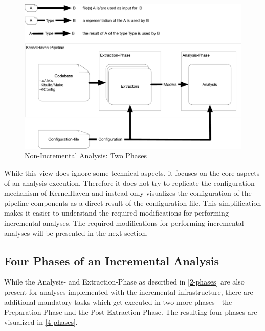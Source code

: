 \documentclass[a4paper]{article}
\begin{document}
\begin{figure}[h] 
  \centering
  \begin{minipage}[b]{1\textwidth} 
    \caption[Non-Incremental Analysis: Two Phases]{Non-Incremental Analysis: Two Phases}\label{2-phases-image}
    \includegraphics[width=1\textwidth]{img/KernelHaven.pdf}
  \end{minipage}
\end{figure}


While this view does ignore some technical aspects, it focuses on the core aspects of an analysis execution. Therefore it does not try to replicate the configuration mechanism of KernelHaven and instead only visualizes the configuration of the pipeline components as a direct result of the configuration file. This simplification makes it easier to understand the required modifications for performing incremental analyses. The required modifications for performing incremental analyses will be presented in the next section.

\subsection{Four Phases of an Incremental Analysis}

While the Analysis- and Extraction-Phase as described in \autoref{2-phases} are also present for analyses implemented with the incremental infrastructure, there are additional mandatory tasks which get executed in two more phases - the Preparation-Phase and the Post-Extraction-Phase. The resulting four phases are visualized in \autoref{4-phases}.
\end{document}

